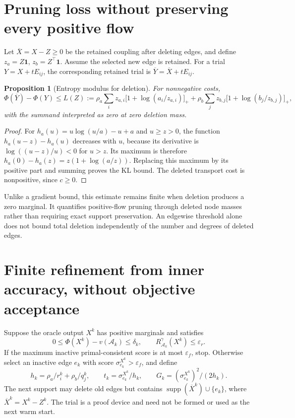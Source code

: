 \documentclass[11pt]{article}
\newtheorem{proposition}{Proposition}
\newcommand{\supp}{\operatorname{supp}}
\begin{document}
\section{Pruning loss without preserving every positive flow}
Let $\overline X=X-Z\geq0$ be the retained coupling after deleting edges, and define $z_a=Z\mathbf1$, $z_b=Z^\top\mathbf1$.
Assume the selected new edge is retained.
For a trial $Y=X+tE_{ij}$, the corresponding retained trial is $\overline Y=\overline X+tE_{ij}$.
\begin{proposition}[Entropy modulus for deletion]\label{prop:prune}
For nonnegative costs,
$$\Phi(\overline Y)-\Phi(Y)\leq L(Z):=\rho_a\sum_i z_{a,i}\big[1+\log(a_i/z_{a,i})\big]_++\rho_b\sum_j z_{b,j}\big[1+\log(b_j/z_{b,j})\big]_+,$$
with the summand interpreted as zero at zero deletion mass.
\end{proposition}
\begin{proof}
For $h_a(u)=u\log(u/a)-u+a$ and $u\geq z>0$, the function $h_a(u-z)-h_a(u)$ decreases with $u$, because its derivative is $\log((u-z)/u)<0$ for $u>z$.
Its maximum is therefore $h_a(0)-h_a(z)=z(1+\log(a/z))$.
Replacing this maximum by its positive part and summing proves the KL bound.
The deleted transport cost is nonpositive, since $c\geq0$.
\end{proof}
Unlike a gradient bound, this estimate remains finite when deletion produces a zero marginal.
It quantifies positive-flow pruning through deleted node masses rather than requiring exact support preservation.
An edgewise threshold alone does not bound total deletion independently of the number and degrees of deleted edges.

\section{Finite refinement from inner accuracy, without objective acceptance}
Suppose the oracle output $X^k$ has positive marginals and satisfies
$$0\leq\Phi(X^k)-v(\mathcal A_k)\leq\delta_k,\qquad R_{\mathcal A_k}^{\gamma}(X^k)\leq\varepsilon_r.$$
If the maximum inactive primal-consistent score is at most $\varepsilon_f$, stop.
Otherwise select an inactive edge $e_k$ with score $\sigma_{e_k}^{X^k}>\varepsilon_f$, and define
$$h_k=\rho_a/r_i^k+\rho_b/q_j^k,\qquad t_k=\sigma_{e_k}^{X^k}/h_k,\qquad G_k=(\sigma_{e_k}^{X^k})^2/(2h_k).$$
The next support may delete old edges but contains $\supp(\overline X^k)\cup\{e_k\}$, where $\overline X^k=X^k-Z^k$.
The trial is a proof device and need not be formed or used as the next warm start.
\end{document}

